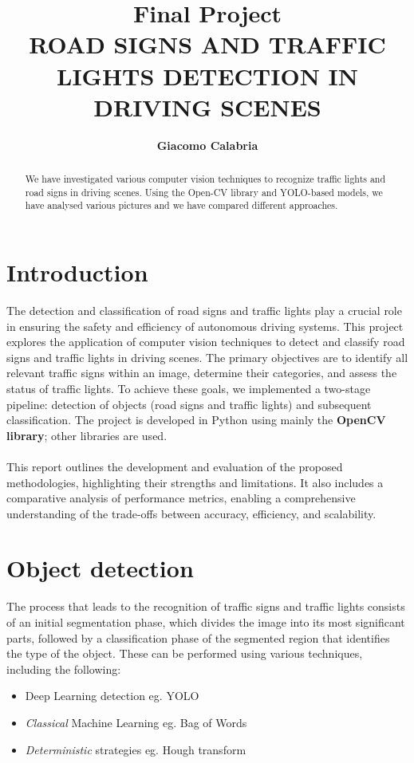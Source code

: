 \documentclass[10pt,conference,a4paper]{IEEEtran}
\title{Final Project\\\textbf{\uppercase{road signs and traffic lights detection in driving scenes}}}
\author{\textbf{Giacomo Calabria}\\       
\IEEEauthorblockA{Computer Vision - University of Padua\\22 January 2025}}
\begin{document}
\maketitle
\tableofcontents
\begin{abstract}
We have investigated various computer vision techniques to recognize traffic lights and road signs in driving scenes. Using the Open-CV library and YOLO-based models, we have analysed various pictures and we have compared different approaches.
\end{abstract}
\section{Introduction}
The detection and classification of road signs and traffic lights play a crucial role in ensuring the safety and efficiency of autonomous driving systems. This project explores the application of computer vision techniques to detect and classify road signs and traffic lights in driving scenes. The primary objectives are to identify all relevant traffic signs within an image, determine their categories, and assess the status of traffic lights. To achieve these goals, we implemented a two-stage pipeline: detection of objects (road signs and traffic lights) and subsequent classification. The project is developed in Python using mainly the \textbf{OpenCV library}; other libraries are used.\\\\
This report outlines the development and evaluation of the proposed methodologies, highlighting their strengths and limitations. It also includes a comparative analysis of performance metrics, enabling a comprehensive understanding of the trade-offs between accuracy, efficiency, and scalability.
\section{Object detection}
The process that leads to the recognition of traffic signs and traffic lights consists of an initial segmentation phase, which divides the image into its most significant parts, followed by a classification phase of the segmented region that identifies the type of the object.
These can be performed using various techniques, including the following:
\begin{itemize}
    \item Deep Learning detection eg. YOLO
    \item \textit{Classical} Machine Learning eg. Bag of Words
    \item \textit{Deterministic} strategies eg. Hough transform
\end{itemize}
\end{document}
